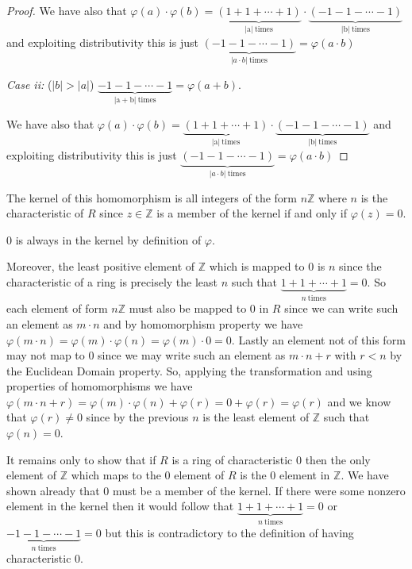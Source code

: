 \documentclass[12pt]{article}
\begin{document}
\begin{enumerate}
\begin{proof}
We have also that  $\varphi(a) \cdot \varphi(b) = \underbrace{ \left( 1+1+\cdots +1\right) }_\mathrm{|a|\ times} \cdot \underbrace{ \left(- 1-1-\cdots -1\right)}_\mathrm{|b|\ times}$ and exploiting distributivity this is just $ \underbrace{ \left(- 1-1-\cdots -1\right) }_{|a \cdot b| \mathrm{\ times}} = \varphi(a\cdot b)$

\emph{Case ii:} ($|b|>|a|$) $ \underbrace{-1-1-\cdots-1}_\mathrm{|a+b|\ times}=\varphi(a+b)$.

We have also that  $\varphi(a) \cdot \varphi(b) = \underbrace{ \left( 1+1+\cdots +1\right) }_\mathrm{|a|\ times} \cdot \underbrace{ \left(- 1-1-\cdots -1\right)}_\mathrm{|b|\ times}$ and exploiting distributivity this is just $ \underbrace{ \left(- 1-1-\cdots -1\right) }_{|a \cdot b| \mathrm{\ times}} = \varphi(a\cdot b)$\end{proof}

The kernel of this homomorphism is all integers of the form $n\mathbb{Z}$ where $n$ is the characteristic of $R$ since $z \in \mathbb{Z} $ is a member of the kernel if and only if $\varphi(z)= 0$. 

0 is always in the kernel by definition of $\varphi$.

Moreover, the least positive element of $\mathbb{Z}$ which is mapped to $0$ is $n$ since the characteristic of a ring is precisely the least $n$ such that $\underbrace{1+1+\cdots+1}_{n\mathrm{\  times}}= 0$. So each element of form $n\mathbb{Z}$ must also be mapped to $0$ in $R$ since we can write such an element as $m\cdot n$ and by homomorphism property we have $\varphi(m \cdot n) = \varphi(m) \cdot \varphi(n) = \varphi(m) \cdot 0 = 0$. Lastly an element not of this form may not map to $0$ since we may write such an element as $m \cdot n + r $ with $r< n$  by the Euclidean Domain property. So, applying the transformation and using properties of homomorphisms we have $\varphi(m \cdot n + r) = \varphi(m) \cdot \varphi(n) + \varphi(r)  = 0 + \varphi(r) = \varphi(r)$ and we know that $\varphi(r) \neq 0$ since by the previous $n$ is the least element of $\mathbb{Z} $ such that $\varphi(n) = 0 $.

It remains only to show that if $R$ is a ring of characteristic $0$ then the only element of $\mathbb{Z} $ which maps to the $0$ element of $R$ is the $0$ element in $\mathbb{Z}$. We have shown already that $0$ must be a member of the kernel. If there were some nonzero element in the kernel then it would follow that $\underbrace{1+1+\cdots+1}_{n\mathrm{\  times}}= 0$ or $\underbrace{-1-1-\cdots-1}_{n\mathrm{\  times}}= 0$ but this is contradictory to the definition of having characteristic 0.


\end{enumerate}
\end{document}
